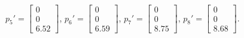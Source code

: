 \documentclass[accentcolor=tud9c,colorbacktitle,inverttitle,landscape,german,presentation,t]{tudbeamer}
\begin{document}
\begin{frame}
{			$p_5'=\begin{bmatrix}  0\\0\\6.52 \end{bmatrix}$, %
			$p_6'=\begin{bmatrix}  0\\0\\6.59 \end{bmatrix}$, %
			$p_7'=\begin{bmatrix}  0\\0\\8.75 \end{bmatrix}$, %
			$p_8'=\begin{bmatrix}  0\\0 \\8.68 \end{bmatrix}$. %
		}
		
	\end{frame}
	
\end{document}
